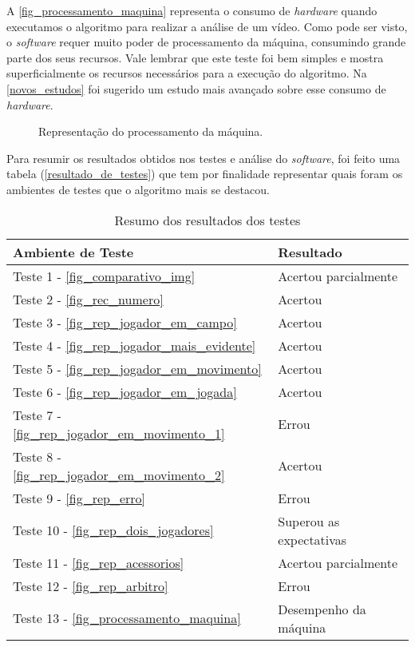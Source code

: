 A \autoref{fig_processamento_maquina}  representa o consumo de \textit{hardware} quando executamos o algoritmo para realizar a análise de um vídeo. Como pode ser visto, o \textit{software} requer muito poder de processamento da máquina, consumindo grande parte dos seus recursos.  Vale lembrar que este teste foi bem simples e mostra superficialmente os recursos necessários para a execução do algoritmo. Na \autoref{novos_estudos} foi sugerido um estudo mais avançado sobre esse consumo de \textit{hardware}.


\begin{figure}[ht]
	\caption{\label{fig_processamento_maquina}Representação do processamento da máquina.}
	\begin{center}
	\end{center}
	\centering {}
\end{figure}

\clearpage

Para resumir os resultados obtidos nos testes e análise do \textit{software}, foi feito uma tabela (\autoref{resultado_de_testes}) que tem por finalidade representar quais foram os ambientes de testes que o algoritmo mais se destacou.

\begin{table}[h]
\centering
\caption{Resumo dos resultados dos testes}
\label{resultado_de_testes}
\begin{tabular}{l|l} 
\hline
\hline
\multicolumn{1}{l|}{\textbf{Ambiente de Teste}} & \multicolumn{1}{l}{\textbf{Resultado}}  \\ 
\hline
\centering
Teste 1 - \autoref{fig_comparativo_img} & Acertou parcialmente\\
Teste 2 - \autoref{fig_rec_numero} & Acertou\\
Teste 3 - \autoref{fig_rep_jogador_em_campo} & Acertou\\
Teste 4 - \autoref{fig_rep_jogador_mais_evidente} & Acertou\\
Teste 5 - \autoref{fig_rep_jogador_em_movimento} & Acertou\\
Teste 6 - \autoref{fig_rep_jogador_em_jogada} & Acertou\\
Teste 7 - \autoref{fig_rep_jogador_em_movimento_1} & Errou\\
Teste 8 - \autoref{fig_rep_jogador_em_movimento_2} & Acertou\\
Teste 9 - \autoref{fig_rep_erro} & Errou\\
Teste 10 - \autoref{fig_rep_dois_jogadores} & Superou as expectativas\\
Teste 11 - \autoref{fig_rep_acessorios} & Acertou parcialmente\\
Teste 12 - \autoref{fig_rep_arbitro} & Errou\\
Teste 13 - \autoref{fig_processamento_maquina} & Desempenho da máquina\\
\hline
\hline
\end{tabular}
\centering {}
\end{table}